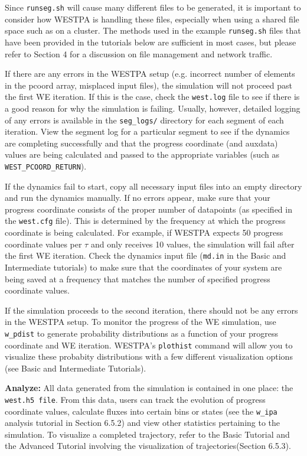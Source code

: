 \documentclass[9pt,tutorial,pubversion]{livecoms}
\begin{document}
Since \verb|runseg.sh| will cause many different files to be generated, it is important to consider how WESTPA is handling these files, especially when using a shared file space such as on a cluster. 
The methods used in the example \verb|runseg.sh| files that have been provided in the tutorials below are sufficient in most cases, but please refer to Section 4 for a discussion on file management and network traffic.

If there are any errors in the WESTPA setup (e.g. incorrect number of elements in the pcoord array, misplaced input files), the simulation will not proceed past the first WE iteration. 
If this is the case, check the \verb|west.log| file to see if there is a good reason for why the simulation is failing. 
Usually, however, detailed logging of any errors is available in the \verb|seg_logs/| directory for each segment of each iteration. 
View the segment log for a particular segment to see if the dynamics are completing successfully and that the progress coordinate (and auxdata) values are being calculated and passed to the appropriate variables (such as \verb|WEST_PCOORD_RETURN|).

If the dynamics fail to start, copy all necessary input files into an empty directory and run the dynamics manually. 
If no errors appear, make sure that your progress coordinate consists of the proper number of datapoints (as specified in the \verb|west.cfg| file). 
This is determined by the frequency at which the progress coordinate is being calculated. 
For example, if WESTPA expects 50 progress coordinate values per $\tau$ and only receives 10 values, the simulation will fail after the first WE iteration. 
Check the dynamics input file (\verb|md.in| in the Basic and Intermediate tutorials) to make sure that the coordinates of your system are being saved at a frequency that matches the number of specified progress coordinate values.

If the simulation proceeds to the second iteration, there should not be any errors in the WESTPA setup. 
To monitor the progress of the WE simulation, use \verb|w_pdist| to generate probability distributions as a function of your progress coordinate and WE iteration. 
WESTPA’s \verb|plothist| command will allow you to visualize these probabity distributions with a few different visualization options (see Basic and Intermediate Tutorials).

\textbf{Analyze:} All data generated from the simulation is contained in one place: the \verb|west.h5 file|. 
From this data, users can track the evolution of progress coordinate values, calculate fluxes into certain bins or states (see the \verb|w_ipa| analysis tutorial in Section 6.5.2) and view other statistics pertaining to the simulation. 
To visualize a completed trajectory, refer to the Basic Tutorial and the Advanced Tutorial involving the visualization of trajectories(Section 6.5.3).
\end{document}
